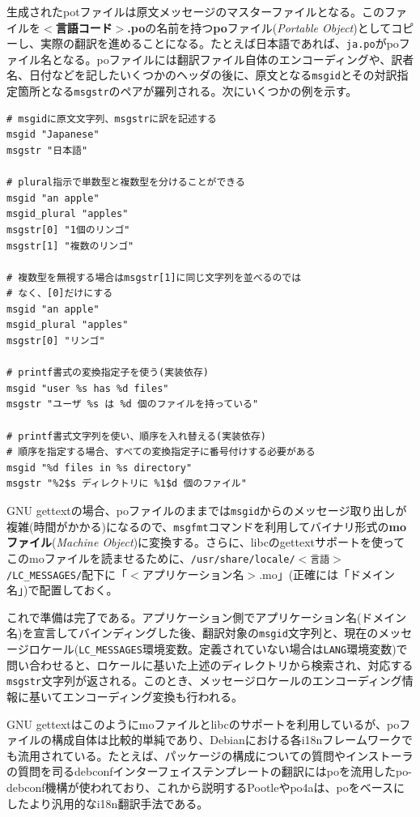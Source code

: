 \documentclass[mingoth,a4paper]{jsarticle}
\begin{document}
生成されたpotファイルは原文メッセージのマスターファイルとなる。このファイルを\textbf{$<$言語コード$>$.po}の名前を持つ\textbf{po}ファイル(\emph{Portable Object})としてコピーし、実際の翻訳を進めることになる。たとえば日本語であれば、\texttt{ja.po}がpoファイル名となる。poファイルには翻訳ファイル自体のエンコーディングや、訳者名、日付などを記したいくつかのヘッダの後に、原文となる\texttt{msgid}とその対訳指定箇所となる\texttt{msgstr}のペアが羅列される。次にいくつかの例を示す。

\begin{screen}
\begin{verbatim}
# msgidに原文文字列、msgstrに訳を記述する
msgid "Japanese"
msgstr "日本語"

# plural指示で単数型と複数型を分けることができる
msgid "an apple"
msgid_plural "apples"
msgstr[0] "1個のリンゴ"
msgstr[1] "複数のリンゴ"

# 複数型を無視する場合はmsgstr[1]に同じ文字列を並べるのでは
# なく、[0]だけにする
msgid "an apple"
msgid_plural "apples"
msgstr[0] "リンゴ"

# printf書式の変換指定子を使う(実装依存)
msgid "user %s has %d files"
msgstr "ユーザ %s は %d 個のファイルを持っている"

# printf書式文字列を使い、順序を入れ替える(実装依存)
# 順序を指定する場合、すべての変換指定子に番号付けする必要がある
msgid "%d files in %s directory"
msgstr "%2$s ディレクトリに %1$d 個のファイル"
\end{verbatim}
\end{screen}

GNU gettextの場合、poファイルのままでは\texttt{msgid}からのメッセージ取り出しが複雑(時間がかかる)になるので、\texttt{msgfmt}コマンドを利用してバイナリ形式の\textbf{moファイル}(\emph{Machine Object})に変換する。さらに、libcのgettextサポートを使ってこのmoファイルを読ませるために、\texttt{/usr/share/locale/$<$言語$>$/LC\_MESSAGES/}配下に「$<$アプリケーション名$>$.mo」(正確には「ドメイン名」)で配置しておく。

これで準備は完了である。アプリケーション側でアプリケーション名(ドメイン名)を宣言してバインディングした後、翻訳対象の\texttt{msgid}文字列と、現在のメッセージロケール(\texttt{LC\_MESSAGES}環境変数。定義されていない場合は\texttt{LANG}環境変数)で問い合わせると、ロケールに基いた上述のディレクトリから検索され、対応する\texttt{msgstr}文字列が返される。このとき、メッセージロケールのエンコーディング情報に基いてエンコーディング変換も行われる。

GNU gettextはこのようにmoファイルとlibcのサポートを利用しているが、poファイルの構成自体は比較的単純であり、Debianにおける各i18nフレームワークでも流用されている。たとえば、パッケージの構成についての質問やインストーラの質問を司るdebconfインターフェイステンプレートの翻訳にはpoを流用したpo-debconf機構が使われており、これから説明するPootleやpo4aは、poをベースにしたより汎用的なi18n翻訳手法である。
\end{document}
